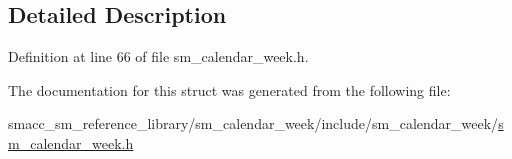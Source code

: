 \subsection{Detailed Description}


Definition at line 66 of file sm\+\_\+calendar\+\_\+week.\+h.



The documentation for this struct was generated from the following file\+:\begin{DoxyCompactItemize}
\item 
smacc\+\_\+sm\+\_\+reference\+\_\+library/sm\+\_\+calendar\+\_\+week/include/sm\+\_\+calendar\+\_\+week/\hyperlink{sm__calendar__week_8h}{sm\+\_\+calendar\+\_\+week.\+h}\end{DoxyCompactItemize}

